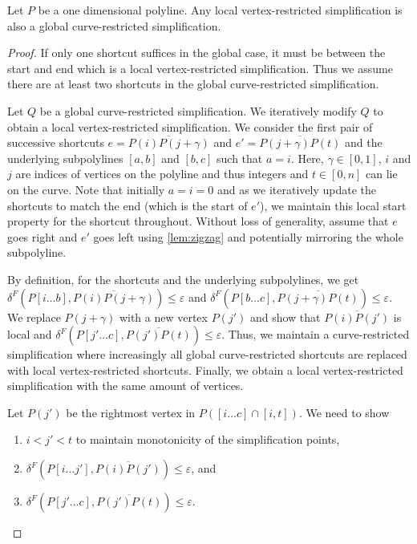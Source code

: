 \begin{theorem}\label{thm:restr_frechet_1}
  Let \(P\) be a one dimensional polyline. Any local vertex-restricted simplification is also a global curve-restricted simplification.
\end{theorem}

\begin{proof}
	If only one shortcut suffices in the global case, it must be between the start and end which is a local vertex-restricted simplification. Thus we assume there are at least two shortcuts in the global curve-restricted simplification.

	Let \(Q\) be a global curve-restricted simplification. We iteratively modify \(Q\) to obtain a local vertex-restricted simplification. We consider the first pair of successive shortcuts \(e = \overline{P(i)P(j + \gamma)}\) and \(e' = \overline{P(j+\gamma)P(t)}\) and the underlying subpolylines \([a, b]\) and \([b, c]\) such that \(a = i\). Here, \(\gamma \in [0, 1]\), \(i\) and \(j\) are indices of vertices on the polyline and thus integers and \(t \in [0, n]\) can lie on the curve. Note that initially \(a = i = 0\) and as we iteratively update the shortcuts to match the end (which is the start of \(e'\)), we maintain this local start property for the shortcut throughout. Without loss of generality, assume that \(e\) goes right and \(e'\) goes left using \cref{lem:zigzag} and potentially mirroring the whole subpolyline.

	By definition, for the shortcuts and the underlying subpolylines, we get \(\delta^F(P[i \dots b], \overline{P(i)P(j + \gamma)}) \leq \varepsilon\) and \(\delta^F(P[b \dots c], \overline{P(j+\gamma)P(t)}) \leq \varepsilon\). We replace \(P(j + \gamma)\) with a new vertex \(P(j')\) and show that \(\overline{P(i)P(j')}\) is local and \(\delta^F(P[j' \dots c], \overline{P(j')P(t)})  \leq \varepsilon\). Thus, we maintain a curve-restricted simplification where increasingly all global curve-restricted shortcuts are replaced with local vertex-restricted shortcuts. Finally, we obtain a local vertex-restricted simplification with the same amount of vertices.

	Let \(P(j')\) be the rightmost vertex in \(P([i \dots c] \cap [i, t])\). We need to show 
	\begin{enumerate}
		\item \(i < j' < t\) to maintain monotonicity of the simplification points,
		\item \(\delta^F(P[i \dots j'], \overline{P(i)P(j')}) \leq \varepsilon\), and
		\item \(\delta^F(P[j' \dots c], \overline{P(j')P(t)}) \leq \varepsilon\).
	\end{enumerate}


\end{proof}
